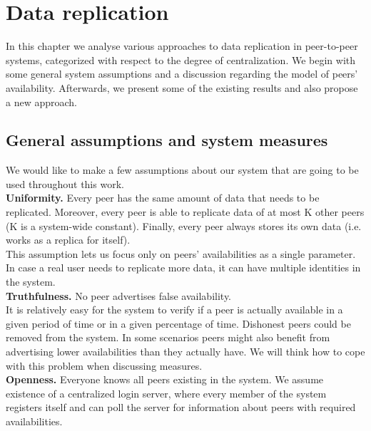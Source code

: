 \documentclass{pracamgren}
\begin{document}
%
%
%
%

\chapter{Data replication}\label{chap:data_replication}

In this chapter we analyse various approaches to data replication in peer-to-peer systems, categorized with respect to the degree of centralization. We begin with some general system assumptions and a discussion regarding the model of peers' availability. Afterwards, we present some of the existing results and also propose a new approach.\\

\section{General assumptions and system measures}

We would like to make a few assumptions about our system that are going to be used throughout this work.\\

{\bf Uniformity.} Every peer has the same amount of data that needs to be replicated. Moreover, every peer is able to replicate data of at most K other peers (K is a system-wide constant). Finally, every peer always stores its own data (i.e. works as a replica for itself).\\
This assumption lets us focus only on peers' availabilities as a single parameter. In case a real user needs to replicate more data, it can have multiple identities in the system.\\

{\bf Truthfulness.} No peer advertises false availability.\\
It is relatively easy for the system to verify if a peer is actually available in a given period of time or in a given percentage of time. Dishonest peers could be removed from the system. In some scenarios peers might also benefit from advertising lower availabilities than they actually have. We will think how to cope with this problem when discussing measures.\\

{\bf Openness.} Everyone knows all peers existing in the system. We assume existence of a centralized login server, where every member of the system registers itself and can poll the server for information about peers with required availabilities.\\
\end{document}
